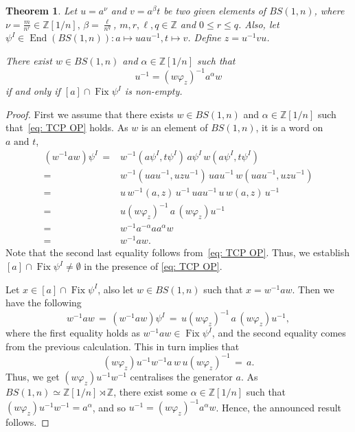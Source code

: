 \documentclass[a4paper]{amsart}
\newtheorem{thm}{Theorem}[section]
\theoremstyle{definition}
\newcommand\ZZ{\mathbb{Z}}
\newcommand{\End}{\operatorname{End}}
\newcommand{\Fix}{\operatorname{Fix}}
\begin{document}
\begin{thm}\label {thm: TCP FP}
    Let $u = a ^\nu$ and $v = a^\beta t$ be two given elements of $BS(1,n)$, where $\nu = \frac{m}{n^r} \in \ZZ[1/n], \, \beta = \frac{\ell}{n^q}$, $m, r, \ell, q \in \ZZ$ and $0 \leq r \leq q$. Also, let $\psi^{I} \in \End(BS(1,n)) \colon a \mapsto uau^{-1}, t \mapsto v$. Define $z = u^{-1} v u$.

    There exist $w \in BS(1,n)$ and $\alpha \in \ZZ[1/n]$ such that 
%
    \begin{equation}\label{eq: TCP OP}
    u^{-1} = (w\varphi_z)^{-1} a^{\alpha} w
    \end{equation}
%
 if and only if $[a] \cap \Fix \psi^{I}$ is non-empty.  
\end{thm}

\begin{proof}
First we assume that there exists $w \in BS(1,n)$ and $\alpha \in \ZZ[1/n]$ such that~\eqref{eq: TCP OP} holds. As $w$ is an element of $BS(1,n)$, it is a word on $a \text{ and }t$,
$$
\begin{array}{rl}
   (w^{-1} a w)\psi^{I} \, = & w^{-1}(a\psi^{I}, t\psi^{I}) \, a\psi^{I} \,  w(a\psi^{I}, t\psi^{I}) \\
    = & w^{-1}(uau^{-1}, uzu^{-1}) \,  uau^{-1} \,  w(uau^{-1}, uzu^{-1})\\
    = & u \, w^{-1}(a,z) \, u^{-1} \, u a u^{-1} \, u\, w(a, z)\, u^{-1}\\
    = & u (w\varphi_z)^{-1} \, a \, (w\varphi_z) u^{-1}\\
    = & w^{-1} a^{-\alpha} a a^{\alpha} w\\
    = & w^{-1} a w.
\end{array}
$$
Note that the second last equality follows from~\eqref{eq: TCP OP}. Thus, we establish $[a] \cap \Fix \psi^{I} \neq \emptyset$ in the presence of \eqref{eq: TCP OP}.

Let $x \in [a] \cap \Fix \psi^{I}$, also let $w \in BS(1,n)$ such that $x = w^{-1} a w$. Then we have the following
%
\[
w^{-1} a w \, = \, (w^{-1} a w) \psi^{I} \, = \, u(w\varphi_z)^{-1} \, a \, (w\varphi_z)u^{-1},
\]
%
where the first equality holds as $w^{-1} a w \in \Fix \psi^{I}$, and the second equality comes from the previous calculation. This in turn implies that 
%
\[
(w\varphi_z)u^{-1}w^{-1} a\,  w\, u(w\varphi_z)^{-1} \, = \, a.
\]
Thus, we get $(w\varphi_z)u^{-1}w^{-1}$ centralises the generator $a$. As $BS(1,n) \simeq \ZZ[1/n] \rtimes \ZZ$, there exist some $\alpha \in \ZZ[1/n]$ such that $(w\varphi_z)u^{-1}w^{-1} = a^\alpha$, and so $u^{-1} = (w\varphi_z)^{-1} a^{\alpha} w$. Hence, the announced result follows.
\end{proof}
\end{document}
